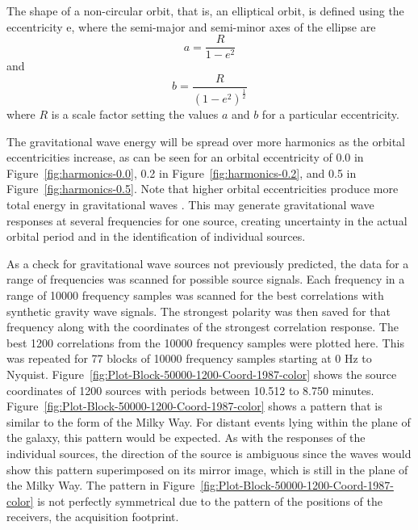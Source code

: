 The shape of a non-circular orbit, that is, an elliptical orbit, is defined using the eccentricity e, where the semi-major and semi-minor axes of the 
ellipse are 
\begin{equation*}
a = \frac{R}{1-e^2}
\end{equation*}
and
\begin{equation*}
b = \frac{R}{(1-e^2)^\frac{1}{2}}
\end{equation*}
where $R$ is a scale factor setting the values $a$ and $b$ for a particular eccentricity.

The gravitational wave energy will be spread over more harmonics as the orbital eccentricities increase, as can be seen for an orbital eccentricity of 0.0 in Figure~\ref{fig:harmonics-0.0}, 0.2 in Figure~\ref{fig:harmonics-0.2}, and 0.5 in Figure~\ref{fig:harmonics-0.5}.  Note that higher orbital eccentricities produce more total energy in gravitational waves \citep{Barone}.  This may generate gravitational wave responses at several frequencies for one source, creating uncertainty in the actual orbital period and in the identification of individual sources.  



As a check for gravitational wave sources not previously predicted, the data for a range of frequencies was scanned
for possible source signals.
Each frequency in a range of 10000 frequency samples was scanned for the best correlations with synthetic gravity wave signals.  The strongest polarity was then saved for that frequency along with the coordinates of the strongest correlation response.  The best 1200 correlations from the 10000 frequency samples were  plotted here.  This was repeated for 77 blocks of 10000 frequency samples starting at 0 Hz to Nyquist.    Figure~\ref{fig:Plot-Block-50000-1200-Coord-1987-color} shows the source coordinates of 1200 sources with periods between 10.512 to 8.750 minutes.
Figure~\ref{fig:Plot-Block-50000-1200-Coord-1987-color} shows a pattern that is similar to the form of the Milky Way. 
For distant events lying within the plane of the galaxy, this pattern would be expected.  As with the responses of the individual sources, the direction of the source is ambiguous since the waves would show this pattern superimposed on its mirror image, which is still in the plane of the Milky Way.   The pattern in Figure~\ref{fig:Plot-Block-50000-1200-Coord-1987-color} is not perfectly symmetrical due to the pattern of the positions of the receivers, the acquisition footprint.

